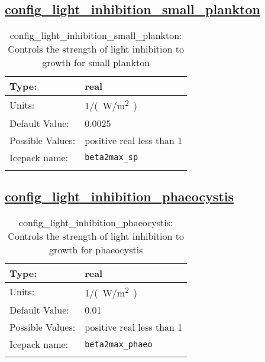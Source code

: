 \subsection[config\_light\_inhibition\_small\_plankton]{\hyperref[sec:nm_tab_biogeochemistry]{config\_light\_inhibition\_small\_plankton}}
\label{subsec:nm_sec_config_light_inhibition_small_plankton}
\begin{center}
\begin{longtable}{| p{2.0in} || p{4.0in} |}
    \hline
    Type: & real \\
    \hline
    Units: & \si{1/(W/m^2)} \\
    \hline
    Default Value: & 0.0025 \\
    \hline
    Possible Values: & positive real less than 1 \\
    \hline
    Icepack name: & \verb+beta2max_sp+ \\
    \hline
    \caption{config\_light\_inhibition\_small\_plankton: Controls the strength of light inhibition to growth for small plankton}
\end{longtable}
\end{center}
\subsection[config\_light\_inhibition\_phaeocystis]{\hyperref[sec:nm_tab_biogeochemistry]{config\_light\_inhibition\_phaeocystis}}
\label{subsec:nm_sec_config_light_inhibition_phaeocystis}
\begin{center}
\begin{longtable}{| p{2.0in} || p{4.0in} |}
    \hline
    Type: & real \\
    \hline
    Units: & \si{1/(W/m^2)} \\
    \hline
    Default Value: & 0.01 \\
    \hline
    Possible Values: & positive real less than 1 \\
    \hline
    Icepack name: & \verb+beta2max_phaeo+ \\
    \hline
    \caption{config\_light\_inhibition\_phaeocystis: Controls the strength of light inhibition to growth for phaeocystis}
\end{longtable}
\end{center}
